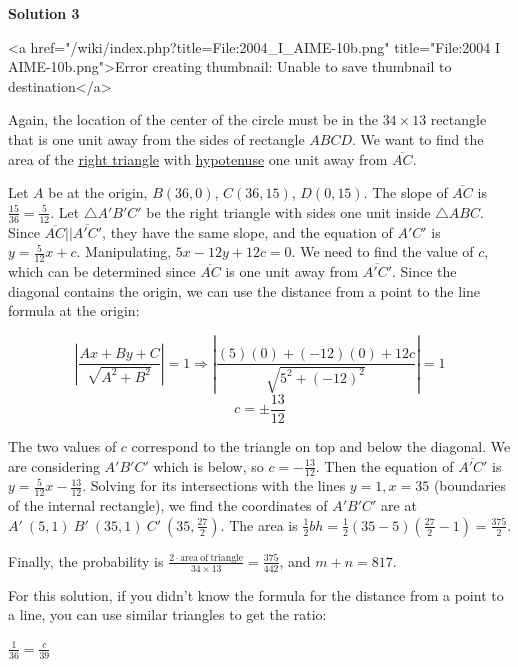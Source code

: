 \begin{enumerate}
 



\textbf{Solution 3}

<a href="/wiki/index.php?title=File:2004\_I\_AIME-10b.png" title="File:2004 I AIME-10b.png">Error creating thumbnail: Unable to save thumbnail to destination</a>

 Again, the location of the center of the circle must be in the $34 \times 13$ rectangle that is one unit away from the sides of rectangle $ABCD$. We want to find the area of the \href{https://artofproblemsolving.com/wiki/index.php?title=Right\_triangle}{right triangle} with \href{https://artofproblemsolving.com/wiki/index.php?title=Hypotenuse}{hypotenuse} one unit away from $\overline{AC}$.

 Let $A$ be at the origin, $B (36,0)$, $C (36,15)$, $D (0,15)$. The slope of $\overline{AC}$ is $\frac{15}{36} = \frac{5}{12}$. Let $\triangle A'B'C'$ be the right triangle with sides one unit inside $\triangle ABC$. Since $\overline{AC} || \overline{A'C'}$, they have the same slope, and the equation of $A'C'$ is $y = \frac{5}{12}x + c$. Manipulating, $5x - 12y + 12c = 0$. We need to find the value of $c$, which can be determined since $\overline{AC}$ is one unit away from $\overline{A'C'}$. Since the diagonal contains the origin, we can use the distance from a point to the line formula at the origin:

 
 \[\left|\frac{Ax + By + C}{\sqrt{A^2+B^2}}\right| = 1 \Longrightarrow \left|\frac{(5)(0) + (-12)(0) + 12c}{\sqrt{5^2 + (-12)^2}}\right| = 1\]
 \[c = \pm \frac{13}{12}\]

 The two values of $c$ correspond to the triangle on top and below the diagonal. We are considering $A'B'C'$ which is below, so $c = -\frac{13}{12}$. Then the equation of $\overline{A'C'}$ is $y = \frac{5}{12}x - \frac{13}{12}$. Solving for its intersections with the lines $y = 1, x = 35$ (boundaries of the internal rectangle), we find the coordinates of $A'B'C'$ are at $A'\ (5,1)\ B'\ (35,1)\ C'\ (35,\frac{27}{2})$. The area is $\frac{1}{2}bh = \frac{1}{2}(35-5)\left(\frac{27}{2} - 1\right) = \frac{375}{2}$.

 Finally, the probability is $\frac{2\cdot \mathrm{area\ of\ triangle}}{34 \times 13} = \frac{375}{442}$, and $m + n = \boxed{817}$.

 For this solution, if you didn't know the formula for the distance from a point to a line, you can use similar triangles to get the ratio:

 $\frac{1}{36}=\frac{c}{39}$


\end{enumerate}
